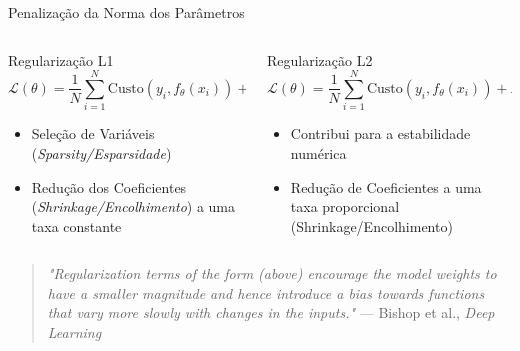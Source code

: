 \documentclass{beamer}
\begin{document}
\begin{frame}{Penalização da Norma dos Parâmetros}
\begin{columns}[T]
\begin{column}{0.5\textwidth}
\begin{block}{Regularização L1}
\vspace{0.2cm}
\scriptsize
\[
\mathcal{L}(\theta) = \frac{1}{N}\sum_{i=1}^{N}\text{Custo}(y_i, f_\theta(x_i)) + \lambda||\theta||_1
\]
\vspace{0.3cm}
\begin{itemize}
    \item Seleção de Variáveis (\textit{Sparsity/Esparsidade})
    \item Redução dos Coeficientes (\textit{Shrinkage/Encolhimento}) a uma taxa constante
\end{itemize}
\vspace{0.2cm}
\end{block}

\end{column}

\begin{column}{0.48\textwidth}
\begin{block}{Regularização L2}
\vspace{0.2cm}
\scriptsize
\[
\mathcal{L}(\theta) = \frac{1}{N}\sum_{i=1}^{N}\text{Custo}(y_i, f_\theta(x_i)) + \lambda||\theta||_2^2
\]
\vspace{0.3cm}
\begin{itemize}
    \item Contribui para a estabilidade numérica
    \item Redução de Coeficientes a uma taxa proporcional (Shrinkage/Encolhimento)
\end{itemize}
\vspace{0.2cm}
\end{block}

\end{column}
\end{columns}
\tiny{\begin{quote}
    \textit{"Regularization terms of the form (above) encourage the model weights to have a smaller magnitude and hence introduce a bias towards functions that vary more slowly with changes in the inputs."} --- Bishop et al., \textit{Deep Learning}
\end{quote}}
\end{frame}
\end{document}
